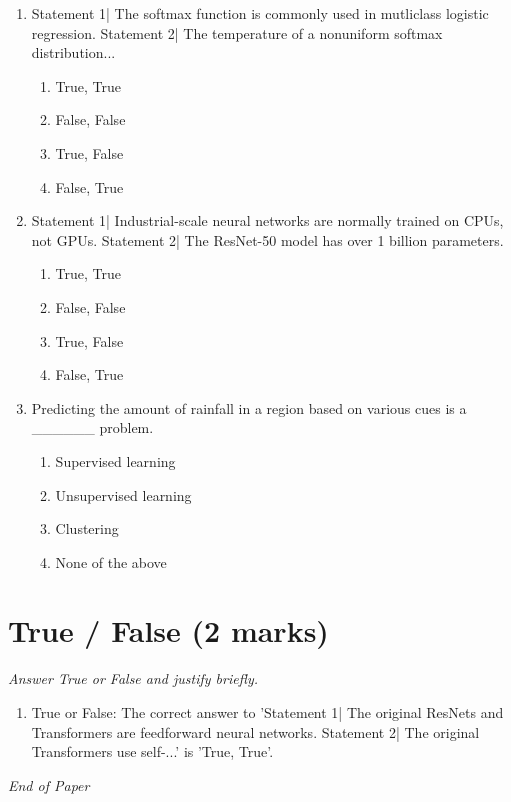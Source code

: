 \documentclass[{\csname fa0013Font0\endcsname\char"0032}{\csname fa0014Font0\endcsname\char"0031}pt]{article}
\begin{document}
\begin{enumerate}[label=\arabic*.]
\item Statement 1| The softmax function is commonly used in mutliclass logistic regression. Statement 2| The temperature of a nonuniform softmax distribution...
\begin{enumerate}[label=(\alph*)]
    \item True, True
    \item False, False
    \item True, False
    \item False, True
\end{enumerate}
\item Statement 1| Industrial-scale neural networks are normally trained on CPUs, not GPUs. Statement 2| The ResNet-50 model has over 1 billion parameters.
\begin{enumerate}[label=(\alph*)]
    \item True, True
    \item False, False
    \item True, False
    \item False, True
\end{enumerate}
\item Predicting the amount of rainfall in a region based on various cues is a \_\_\_\_\_\_ problem.
\begin{enumerate}[label=(\alph*)]
    \item Supervised learning
    \item Unsupervised learning
    \item Clustering
    \item None of the above
\end{enumerate}
\end{enumerate}

\section*{True / False (2 marks)}
\textit{Answer True or False and justify briefly.}
\begin{enumerate}[label=\arabic*.]
\item True or False: The correct answer to 'Statement 1| The original ResNets and Transformers are feedforward neural networks. Statement 2| The original Transformers use self-...' is 'True, True'.
\end{enumerate}

\vfill
\noindent\textit{End of Paper}
\end{document}
